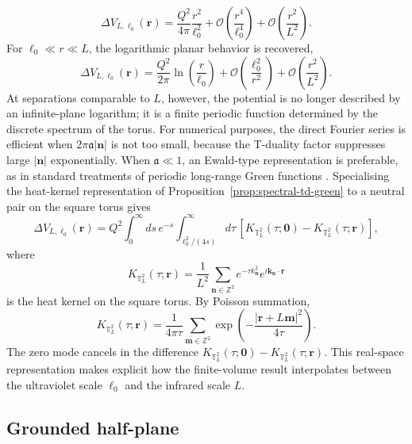 \documentclass[openacc]{rsproca_new}%
\begin{document}
\begin{equation}
  \Delta V_{L,\ell_0}(\mathbf r)=\frac{Q^2}{4\pi}\frac{r^2}{\ell_0^2}
  +\mathcal O\!\left(\frac{r^4}{\ell_0^4}\right)
  +\mathcal O\!\left(\frac{r^2}{L^2}\right).
\end{equation}
For \(\ell_0\ll r\ll L\), the logarithmic planar behavior is recovered,
\begin{equation}
\Delta V_{L,\ell_0}(\mathbf r)=\frac{Q^2}{2\pi}\ln\left(\frac{r}{\ell_0}\right)
+\mathcal O\!\left(\frac{\ell_0^2}{r^2}\right)
+\mathcal O\!\left(\frac{r^2}{L^2}\right).
\end{equation}
At separations comparable to \(L\), however, the potential is no longer described by an infinite-plane logarithm; it is a finite periodic function determined by the discrete spectrum of the torus. For numerical purposes, the direct Fourier series is efficient when \(2\pi\mathfrak a|\mathbf n|\) is not too small, because the T-duality factor suppresses large \(|\mathbf n|\) exponentially. When \(\mathfrak a\ll1\), an Ewald-type representation is preferable, as in standard treatments of periodic long-range Green functions \cite{Ewald1921,Linton1998}. Specialising the heat-kernel representation of Proposition~\ref{prop:spectral-td-green} to a neutral pair on the square torus gives
\begin{equation}
  \Delta V_{L,\ell_0}(\mathbf r)=Q^2\int_0^\infty ds\,e^{-s}\int_{\ell_0^2/(4s)}^\infty d\tau\,
  \left[K_{\mathbb T^2_L}(\tau;\mathbf 0)-K_{\mathbb T^2_L}(\tau;\mathbf r)\right],
\end{equation}
where
\begin{equation}
  K_{\mathbb T^2_L}(\tau;\mathbf r)=\frac{1}{L^2}\sum_{\mathbf n\in\mathbb Z^2}
  e^{-\tau k_{\mathbf n}^2}e^{i\mathbf k_{\mathbf n}\cdot\mathbf r}
\end{equation}
is the heat kernel on the square torus. By Poisson summation,
\begin{equation}
  K_{\mathbb T^2_L}(\tau;\mathbf r)=\frac{1}{4\pi\tau}\sum_{\mathbf m\in\mathbb Z^2}
  \exp\left(-\frac{|\mathbf r+L\mathbf m|^2}{4\tau}\right).
\end{equation}
The zero mode cancels in the difference \(K_{\mathbb T^2_L}(\tau;\mathbf 0)-K_{\mathbb T^2_L}(\tau;\mathbf r)\). This real-space representation makes explicit how the finite-volume result interpolates between the ultraviolet scale \(\ell_0\) and the infrared scale \(L\).


\subsection{Grounded half-plane}\label{subsec:half_plane}
\end{document}
